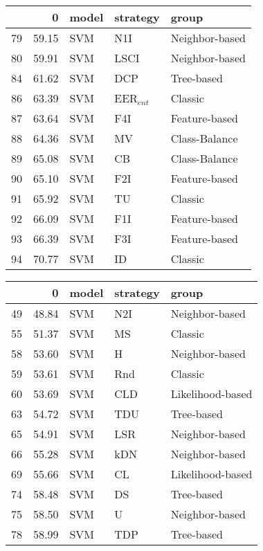 \begin{tabular}{lrlll}
\toprule
 & 0 & model & strategy & group \\
\midrule
79 & 59.15 & SVM & N1I & Neighbor-based \\
80 & 59.91 & SVM & LSCI & Neighbor-based \\
84 & 61.62 & SVM & DCP & Tree-based \\
86 & 63.39 & SVM & EER$_{ent}$ & Classic \\
87 & 63.64 & SVM & F4I & Feature-based \\
88 & 64.36 & SVM & MV & Class-Balance \\
89 & 65.08 & SVM & CB & Class-Balance \\
90 & 65.10 & SVM & F2I & Feature-based \\
91 & 65.92 & SVM & TU & Classic \\
92 & 66.09 & SVM & F1I & Feature-based \\
93 & 66.39 & SVM & F3I & Feature-based \\
94 & 70.77 & SVM & ID & Classic \\
\bottomrule
\end{tabular}
\begin{tabular}{lrlll}
\toprule
 & 0 & model & strategy & group \\
\midrule
49 & 48.84 & SVM & N2I & Neighbor-based \\
55 & 51.37 & SVM & MS & Classic \\
58 & 53.60 & SVM & H & Neighbor-based \\
59 & 53.61 & SVM & Rnd & Classic \\
60 & 53.69 & SVM & CLD & Likelihood-based \\
63 & 54.72 & SVM & TDU & Tree-based \\
65 & 54.91 & SVM & LSR & Neighbor-based \\
66 & 55.28 & SVM & kDN & Neighbor-based \\
69 & 55.66 & SVM & CL & Likelihood-based \\
74 & 58.48 & SVM & DS & Tree-based \\
75 & 58.50 & SVM & U & Neighbor-based \\
78 & 58.99 & SVM & TDP & Tree-based \\
\bottomrule
\end{tabular}
